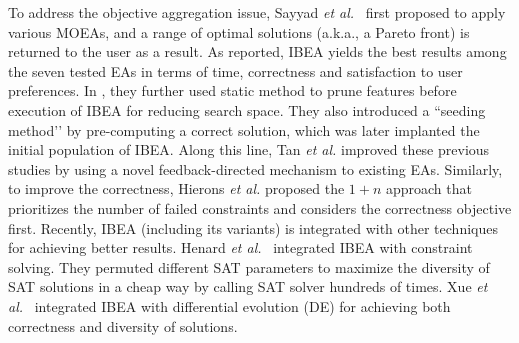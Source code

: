 To address the objective aggregation issue, Sayyad \emph{et al.}~\cite{DBLP:conf/icse/SayyadMA13,conf/cmsbse/SayyadMA13} first proposed to apply various MOEAs, and a range of optimal solutions (a.k.a., a Pareto front) is returned to the user as a result. As reported, IBEA \cite{DBLP:conf/ppsn/ZitzlerK04} yields the best results among the seven tested EAs in terms of time, correctness and satisfaction to user preferences. In \cite{DBLP:dblp_conf/kbse/SayyadIMA13}, they further used static method to prune features before execution of IBEA for reducing search space. They also introduced a ``seeding method\rq\rq{} by pre-computing a correct solution, which was later implanted the initial population of IBEA. Along this line, Tan \emph{et al.} \cite{DBLP:conf/issta/TanXCSLD15} improved these previous studies by using a novel feedback-directed mechanism to existing EAs. %
Similarly, to improve the correctness, Hierons \emph{et al.} \cite{DBLP:journals/tosem/HieronsLLSZ16} proposed the $1+n$ approach that prioritizes the number of failed constraints and considers the correctness objective first.
Recently, IBEA (including its variants) is integrated with other techniques for achieving better results.  Henard \emph{et al.}~\cite{DBLP:conf/icse/HenardPHT15}
integrated IBEA with constraint solving. They permuted different SAT parameters to maximize the diversity of SAT solutions in a cheap way by calling SAT solver hundreds of times. %
Xue \emph{et al.}~\cite{DBLP:journals/asc/XueZT0CC016} integrated IBEA with differential evolution (DE) for achieving both correctness and diversity of solutions. %

